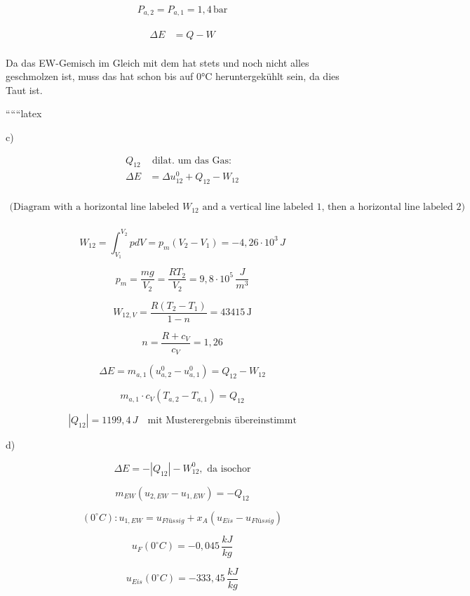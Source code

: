 \begin{align*}
P_{a,2} = P_{a,1} = 1,4 \, \text{bar}
\end{align*}

\begin{align*}
\Delta E &= Q - W \\
\end{align*}

Da das EW-Gemisch im Gleich mit dem hat stets und noch nicht alles geschmolzen ist, muss das hat schon bis auf 0°C heruntergekühlt sein, da dies Taut ist.

``````latex


c)

\begin{align*}
Q_{12} & \text{ dilat. um das Gas:} \\
\Delta E &= \Delta u_{12}^0 + Q_{12} - W_{12} \\
\end{align*}

\[
\begin{array}{c}
\text{(Diagram with a horizontal line labeled } W_{12} \text{ and a vertical line labeled } 1 \text{, then a horizontal line labeled } 2 \text{)} \\
\end{array}
\]

\[
W_{12} = \int_{V_1}^{V_2} p dV = p_{m} (V_2 - V_1) = -4,26 \cdot 10^3 \, J
\]

\[
p_{m} = \frac{m g}{V_2} = \frac{R T_2}{V_2} = 9,8 \cdot 10^5 \, \frac{J}{m^3}
\]

\[
W_{12, V} = \frac{R (T_2 - T_1)}{1 - n} = 43415 \, \text{J}
\]

\[
n = \frac{R + c_V}{c_V} = 1,26
\]

\[
\Delta E = m_{a,1} (u_{a,2}^0 - u_{a,1}^0) = Q_{12} - W_{12}
\]

\[
m_{a,1} \cdot c_V (T_{a,2} - T_{a,1}) = Q_{12}
\]

\[
|Q_{12}| = 1199,4 \, J \quad \text{mit Musterergebnis übereinstimmt}
\]

d)

\[
\Delta E = -|Q_{12}| - W_{12}^0, \text{ da isochor}
\]

\[
m_{EW} (u_{2,EW} - u_{1,EW}) = -Q_{12}
\]

\[
(0^\circ C): u_{1,EW} = u_{Flüssig} + x_{A} (u_{Eis} - u_{Flüssig})
\]

\[
u_{F}(0^\circ C) = -0,045 \, \frac{kJ}{kg}
\]

\[
u_{Eis}(0^\circ C) = -333,45 \, \frac{kJ}{kg}
\]

